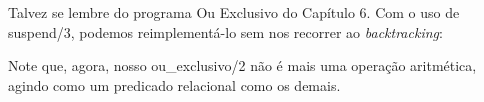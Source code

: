 \documentclass{article}
\begin{document}
Talvez se lembre do programa Ou Exclusivo do Capítulo 6. Com o uso de suspend/3, podemos reimplementá-lo sem nos recorrer ao \textit{backtracking}:
\vspace{3cm}



Note que, agora, nosso ou\_exclusivo/2 não é mais uma operação aritmética, agindo como um predicado relacional como os demais.
\end{document}
